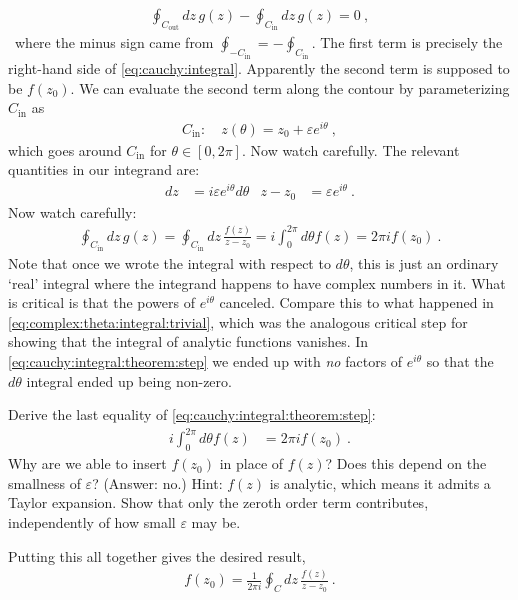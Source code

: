 \begin{align}
	\oint_{C_\text{out}} dz\, g(z)
	-
	\oint_{C_\text{in}} dz\, g(z)
	= 0 \ ,
\end{align}\
where the minus sign came from $\oint_{-C_\text{in}} = - \oint_{C_\text{in}}$. The first term is precisely the right-hand side of \eqref{eq:cauchy:integral}. Apparently the second term is supposed to be $f(z_0)$. We can evaluate the second term along the contour by parameterizing $C_\text{in}$ as
\begin{align}
	C_\text{in}: \quad z(\theta) = z_0 + \varepsilon e^{i\theta} \ ,
\end{align}
which goes around $C_\text{in}$ for $\theta \in [0,2\pi]$. Now watch carefully. The relevant quantities in our integrand are:
\begin{align}
	dz &= i\varepsilon e^{i\theta} d\theta 
	&
	z-z_0 &= \varepsilon e^{i\theta} \ .
\end{align}
Now watch carefully: 
\begin{align}
	\oint_{C_\text{in}} dz\, g(z)
	=
	\oint_{C_\text{in}} dz\, \frac{f(z)}{z-z_0}
	= 
	i\int_0^{2\pi} d\theta f(z) 
	= 2\pi i f(z_0) \ . 
	\label{eq:cauchy:integral:theorem:step}
\end{align}
Note that once we wrote the integral with respect to $d\theta$, this is just an ordinary `real' integral where the integrand happens to have complex numbers in it. What is critical is that the powers of $e^{i\theta}$ canceled. Compare this to what happened in \eqref{eq:complex:theta:integral:trivial}, which was the analogous critical step for showing that the integral of analytic functions vanishes. In \eqref{eq:cauchy:integral:theorem:step} we ended up with \emph{no} factors of $e^{i\theta}$ so that the $d\theta$ integral ended up being non-zero. 
\begin{exercise}
Derive the last equality of \eqref{eq:cauchy:integral:theorem:step}:
\begin{align}
	i\int_0^{2\pi} d\theta f(z) 
	&= 2\pi i f(z_0) \ .
\end{align}
Why are we able to insert $f(z_0)$ in place of $f(z)$? Does this depend on the smallness of $\varepsilon$? (Answer: no.) {Hint}: $f(z)$ is analytic, which means it admits a Taylor expansion. Show that only the zeroth order term contributes, independently of how small $\varepsilon$ may be.
\end{exercise}

Putting this all together gives the desired result,
\begin{align}
	f(z_0) = \frac{1}{2\pi i}\oint_C dz\, \frac{f(z)}{z-z_0} \ .
	\label{eq:cauchy:integral:theorem}
\end{align}

